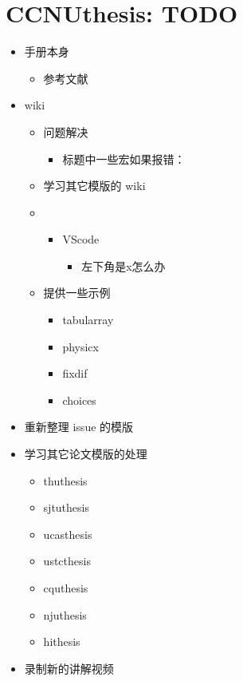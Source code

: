 \documentclass{ccnudoc}
\begin{document}
\section{CCNUthesis: TODO}

\begin{itemize}
  \item 手册本身
    \begin{itemize}
      \item 参考文献
    \end{itemize}
  \item wiki
    \begin{itemize}
      \item 问题解决
        \begin{itemize}
          \item 标题中一些宏如果报错：
        \end{itemize}
      \item 学习其它模版的 wiki
      \item 
        \begin{itemize}
          \item VScode
            \begin{itemize}
              \item 左下角是x怎么办
            \end{itemize}
        \end{itemize}
      \item 提供一些示例
        \begin{itemize}
          \item tabularray
          \item physicx
          \item fixdif
          \item choices
        \end{itemize}
    \end{itemize}
  \item 重新整理 issue 的模版
  \item 学习其它论文模版的处理
    \begin{itemize}
      \item thuthesis
      \item sjtuthesis
      \item ucasthesis
      \item ustcthesis
      \item cquthesis
      \item njuthesis
      \item hithesis
    \end{itemize}
  \item 录制新的讲解视频
\end{itemize}

\printbibliography
\end{document}
